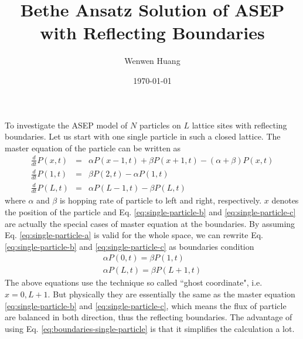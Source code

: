 \documentclass[12pt,a4paper]{article}
\begin{document}
\title{Bethe Ansatz Solution of ASEP with Reflecting Boundaries}
\author{Wenwen Huang}
\date{\today}
\maketitle

To investigate the ASEP model of $N$ particles on $L$ lattice sites with
reflecting boundaries. Let us start with one single particle in such a closed
lattice. The master equation of the particle can be written as
\begin{subequations}
\begin{eqnarray}
    \label{eq:single-particle-a}
    \frac{d}{dt} P(x, t) & = & \alpha P(x-1, t) + \beta P(x+1, t) - (\alpha +
    \beta)P(x, t) \\
    \label{eq:single-particle-b}
    \frac{d}{dt} P(1, t) & = & \beta P(2, t) - \alpha P(1, t) \\
    \label{eq:single-particle-c}
    \frac{d}{dt} P(L, t) & = & \alpha P(L-1, t) - \beta P(L, t)
\end{eqnarray}
\end{subequations}
where $\alpha$ and $\beta$ is hopping rate of particle to left and right,
respectively. $x$ denotes the position of the particle and Eq.
\eqref{eq:single-particle-b} and \eqref{eq:single-particle-c} are actually the
special cases of master equation at the boundaries.  By assuming Eq.
\eqref{eq:single-particle-a} is valid for the whole space, we can rewrite
Eq. \eqref{eq:single-particle-b} and \eqref{eq:single-particle-c} as boundaries
condition 
\begin{subequations}
    \label{eq:boundaries-single-particle}
\begin{eqnarray}
    \alpha P(0, t) = \beta P(1, t) \\
    \alpha P(L, t) = \beta P(L+1, t)
\end{eqnarray}
\end{subequations}
The above equations use the technique so called ``ghost coordinate", i.e.
$x=0,L+1$. But physically they are essentially the same as the master equation
\eqref{eq:single-particle-b} and \eqref{eq:single-particle-c}, which means the
flux of particle are balanced in both direction, thus the reflecting boundaries.
The advantage of using Eq. \eqref{eq:boundaries-single-particle} is that it
simplifies the calculation a lot.  
\end{document}
